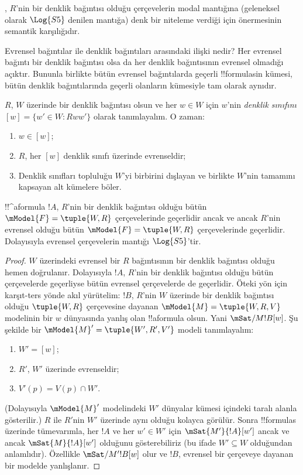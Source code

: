, $R$'nin bir denklik bağıntısı olduğu
çerçevelerin modal mantığına (geleneksel olarak $\Log{S5}$ denilen mantığa)
denk bir niteleme verdiği için  önermesinin
semantik karşılığıdır.

Evrensel bağıntılar ile denklik bağıntıları arasındaki ilişki nedir? Her
evrensel bağıntı bir denklik bağıntısı olsa da her denklik bağıntısının
evrensel olmadığı açıktır. Bununla birlikte bütün evrensel bağıntılarda
geçerli !!{formula}s{}in kümesi, bütün denklik bağıntılarında geçerli
olanların kümesiyle tam olarak aynıdır.

\begin{prop}
  $R$, $W$ üzerinde bir denklik bağıntısı olsun ve her $w\in W$ için $w$'nin
  \emph{denklik sınıfını} $[w]=\{w'\in W:Rww'\}$ olarak tanımlayalım. O
  zaman:
  \begin{enumerate}
  \item $w\in[w]$;
  \item $R$, her $[w]$ denklik sınıfı üzerinde evrenseldir;
  \item Denklik sınıfları topluluğu $W$'yi birbirini dışlayan ve birlikte
    $W$'nin tamamını kapsayan alt kümelere böler.
  \end{enumerate}
\end{prop}

\begin{prop}
  !!^a{formula} $!A$, $R$'nin bir denklik bağıntısı olduğu bütün
  $\mModel{F}=\tuple{W,R}$ çerçevelerinde geçerlidir ancak ve ancak $R$'nin
  evrensel olduğu bütün $\mModel{F}=\tuple{W,R}$ çerçevelerinde geçerlidir.
  Dolayısıyla evrensel çerçevelerin mantığı $\Log{S5}$'tir.
\end{prop}

\begin{proof}
  $W$ üzerindeki evrensel bir $R$ bağıntısının bir denklik bağıntısı olduğu
  hemen doğrulanır. Dolayısıyla $!A$, $R$'nin bir denklik bağıntısı olduğu
  bütün çerçevelerde geçerliyse bütün evrensel çerçevelerde de geçerlidir.
  Öteki yön için karşıt-ters yönde akıl yürütelim: $!B$, $R$'nin $W$
  üzerinde bir denklik bağıntısı olduğu $\tuple{W,R}$ çerçevesine dayanan
  $\mModel{M}=\tuple{W,R,V}$ modelinin bir $w$ dünyasında yanlış olan
  !!a{formula} olsun. Yani $\mSat/{M}{!B}[w]$. Şu şekilde bir
  $\mModel{M}'=\tuple{W',R',V'}$ modeli tanımlayalım:
  \begin{enumerate}
  \item $W'=[w]$;
  \item $R'$, $W'$ üzerinde evrenseldir;
  \item $V'(p)=V(p)\cap W'$.
  \end{enumerate}
  (Dolayısıyla $\mModel{M}'$ modelindeki $W'$ dünyalar kümesi
   içindeki taralı alanla gösterilir.) $R$ ile $R'$nin
  $W'$ üzerinde aynı olduğu kolayca görülür. Sonra !!{formula}s üzerinde
  tümevarımla, her $!A$ ve her $w'\in W'$ için
  $\mSat{M'}{!A}[w']$ ancak ve ancak $\mSat{M}{!A}[w']$ olduğunu gösterebiliriz
  (bu ifade $W'\subseteq W$ olduğundan anlamlıdır). Özellikle
  $\mSat/{M'}{!B}[w]$ olur ve $!B$, evrensel bir çerçeveye dayanan bir
  modelde yanlışlanır.
\end{proof}

